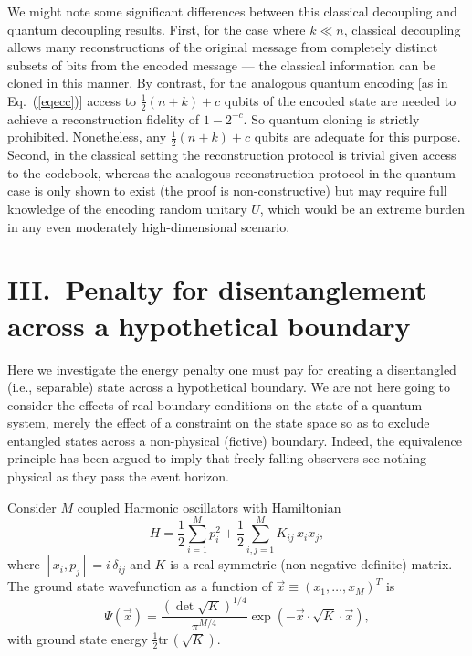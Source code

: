 \documentclass[twocolumn,aps,showpacs,prl]{revtex4}
\begin{document}
We might note some significant differences between this classical
decoupling and quantum decoupling results. First, for the case where
$k\ll n$, classical decoupling allows many reconstructions of the
original message from completely distinct subsets of bits from the
encoded message --- the classical information can be cloned in this
manner. By contrast, for the analogous quantum encoding [as in
Eq.~(\ref{eqecc})] access to $\frac{1}{2}(n+k)+c$ qubits of the
encoded state are needed to achieve a reconstruction fidelity of
$1-2^{-c}$. So quantum cloning is strictly prohibited. Nonetheless, any
$\frac{1}{2}(n+k)+c$ qubits are adequate for this purpose. Second, in
the classical setting the reconstruction protocol is trivial given access
to the codebook, whereas the analogous reconstruction protocol in the
quantum case is only shown to exist (the proof is non-constructive)
but may require full knowledge of the encoding random unitary $U$,
which would be an extreme burden in any even moderately
high-dimensional scenario.

\section{III.\ Penalty for disentanglement across a hypothetical boundary}

Here we investigate the energy penalty one must pay for creating
a disentangled (i.e., separable) state across a hypothetical boundary. 
We are not here going to consider the effects of real boundary conditions
on the state of a quantum system, merely the effect of a constraint
on the state space so as to exclude entangled states across a
non-physical (fictive) boundary. Indeed, the equivalence principle has
been argued \cite{Susskind93app} to imply that freely falling observers
see nothing physical as they pass the event horizon.

Consider $M$ coupled Harmonic oscillators with Hamiltonian
\begin{equation}
H=\frac{1}{2}\sum_{i=1}^M p_i^2 + \frac{1}{2}\sum_{i,j=1}^M
K_{ij}\, x_i x_j,
\label{HOHam}
\end{equation}
where $[x_i,p_j]=i\, \delta_{ij}$ and $K$ is a real symmetric (non-negative
definite) matrix. The ground state wavefunction as a function of
$\vec x\equiv (x_1,\ldots,x_M)^T$ is
\begin{equation}
\Psi(\vec x)=\frac{(\det \sqrt{K})^{1/4}}{\pi^{M/4}}
\exp(-\vec x\cdot \sqrt{K}\cdot \vec x),
\end{equation}
with ground state energy $\frac{1}{2} \text{tr}\,( \sqrt{K})$.
\end{document}
